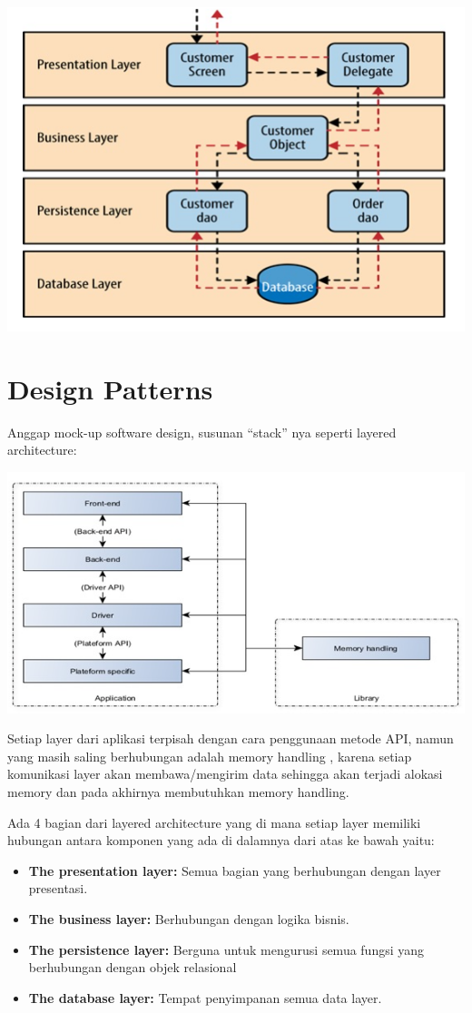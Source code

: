 \documentclass[a4paper,12pt]{article}
\begin{document}
\includegraphics{Software Architecture Pattern.png}


\section*{Design Patterns}

Anggap mock-up software design, susunan “stack” nya seperti layered architecture:

\includegraphics{Design Pattern.png}

Setiap layer dari aplikasi terpisah dengan cara penggunaan metode API, namun yang masih saling berhubungan adalah memory handling , karena setiap komunikasi layer akan membawa/mengirim data sehingga akan terjadi alokasi memory dan pada akhirnya membutuhkan memory handling.

Ada 4 bagian dari layered architecture yang di mana setiap layer memiliki hubungan antara komponen yang ada di dalamnya dari atas ke bawah yaitu:

\begin{itemize}
	\item \textbf{The presentation layer:} Semua bagian yang berhubungan dengan layer presentasi.
	\item \textbf{The business layer:} Berhubungan dengan logika bisnis.
	\item \textbf{The persistence layer:} Berguna untuk mengurusi semua fungsi yang berhubungan dengan objek relasional

	\item \textbf{The database layer:} Tempat penyimpanan semua data layer.
\end{itemize}
\end{document}
